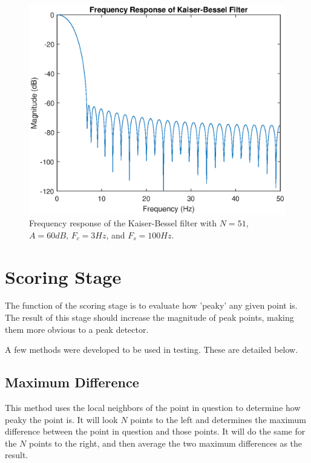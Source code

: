                 \begin{figure}[!th]
                    \includegraphics[width=\textwidth]{Images/kb_filter.eps}
                    \centering
                    \caption{Frequency response of the Kaiser-Bessel filter with $N=51$, $A=60dB$, $F_c = 3Hz$, and $F_s= 100Hz$.}
                    \label{img_kb_filter}
                \end{figure}  

        \section{Scoring Stage}

            The function of the scoring stage is to evaluate how 'peaky' any given point is. The result of this stage should increase the magnitude of peak points, making them more obvious to a peak detector.

            A few methods were developed to be used in testing. These are detailed below.

            \subsection{Maximum Difference}

                This method uses the local neighbors of the point in question to determine how peaky the point is. It will look $N$ points to the left and determines the maximum difference between the point in question and those points. It will do the same for the $N$ points to the right, and then average the two maximum differences as the result.

